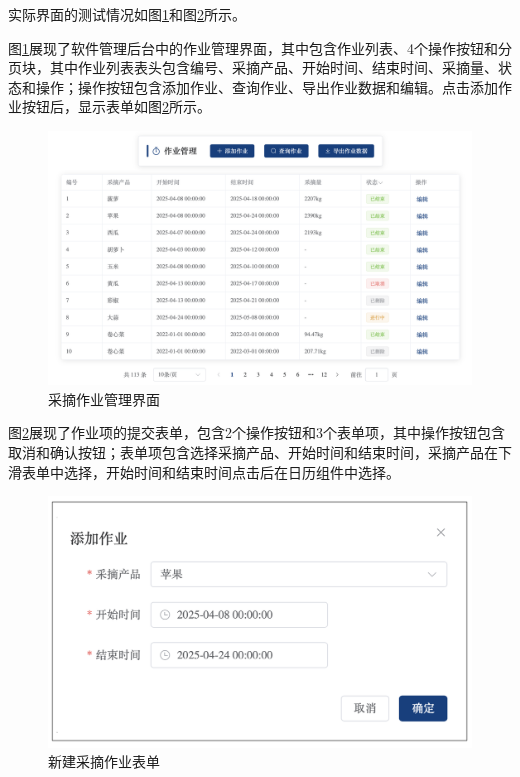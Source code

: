 实际界面的测试情况如图\ref{fig:web-work}和图\ref{fig:form-new-work}所示。

图\ref{fig:web-work}展现了软件管理后台中的作业管理界面，其中包含作业列表、4个操作按钮和分页块，其中作业列表表头包含编号、采摘产品、开始时间、结束时间、采摘量、状态和操作；操作按钮包含添加作业、查询作业、导出作业数据和编辑。点击添加作业按钮后，显示表单如图\ref{fig:form-new-work}所示。

\begin{figure}[H]
    \centering
    \includegraphics[width=0.9\linewidth]{../result/web-work.png}
    \caption{采摘作业管理界面}
    \label{fig:web-work}
\end{figure}

图\ref{fig:form-new-work}展现了作业项的提交表单，包含2个操作按钮和3个表单项，其中操作按钮包含取消和确认按钮；表单项包含选择采摘产品、开始时间和结束时间，采摘产品在下滑表单中选择，开始时间和结束时间点击后在日历组件中选择。

\begin{figure}[H]
    \centering
    \includegraphics[width=0.9\linewidth]{../result/form-new-work.png}
    \caption{新建采摘作业表单}
    \label{fig:form-new-work}
\end{figure}

